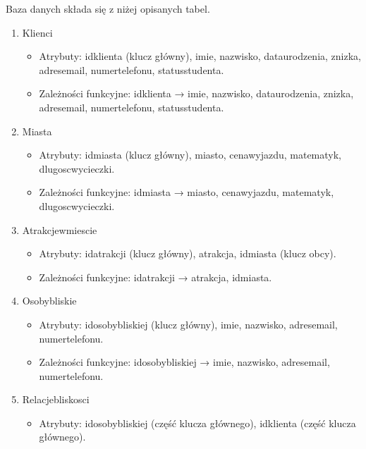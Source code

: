 \documentclass{article}
\begin{document}
	Baza danych składa się z niżej opisanych tabel. 
	
	\begin{enumerate}
		\item Klienci
		\begin{itemize}
			\item Atrybuty: id\textunderscore klienta (klucz główny), imie, nazwisko, data\textunderscore urodzenia, znizka, adres\textunderscore email, numer\textunderscore telefonu, status\textunderscore studenta.
			\item Zależności funkcyjne: id\textunderscore klienta → imie, nazwisko, data\textunderscore urodzenia, znizka, adres\textunderscore email, numer\textunderscore telefonu, status\textunderscore studenta.
		\end{itemize}
		
		\item Miasta
		\begin{itemize}
			\item Atrybuty: id\textunderscore miasta (klucz główny), miasto, cena\textunderscore wyjazdu, matematyk, dlugosc\textunderscore wycieczki.
			\item Zależności funkcyjne: id\textunderscore miasta → miasto, cena\textunderscore wyjazdu, matematyk, dlugosc\textunderscore wycieczki.
		\end{itemize}
		
		\item Atrakcje\textunderscore w\textunderscore miescie
		\begin{itemize}
			\item Atrybuty: id\textunderscore atrakcji (klucz główny), atrakcja, id\textunderscore miasta (klucz obcy).
			\item Zależności funkcyjne: id\textunderscore atrakcji → atrakcja, id\textunderscore miasta.
		\end{itemize}
		
		\item Osoby\textunderscore bliskie
		\begin{itemize}
			\item Atrybuty: id\textunderscore osoby\textunderscore bliskiej (klucz główny), imie, nazwisko, adres\textunderscore email, numer\textunderscore telefonu.
			\item Zależności funkcyjne: id\textunderscore osoby\textunderscore bliskiej → imie, nazwisko, adres\textunderscore email, numer\textunderscore telefonu.
		\end{itemize}
		
		\item Relacje\textunderscore bliskosci
		\begin{itemize}
			\item Atrybuty: id\textunderscore osoby\textunderscore bliskiej (część klucza głównego), id\textunderscore klienta (część klucza głównego).
		\end{itemize}
		

\end{enumerate}
\end{document}
